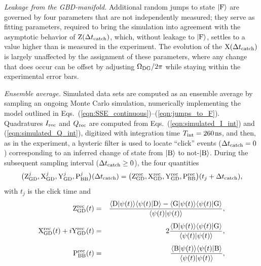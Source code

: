 \documentclass[
						superscriptaddress, 																 amsmath, amssymb,
		 aps,  prb,  
										floatfix,
		linenumbers,
			]{revtex4-1}
\begin{document}
\textit{Leakage from the {\rm GBD}-manifold.} Additional random jumps to state $|{\rm F}\rangle$ are governed by four parameters that are not independently measured; they serve as fitting parameters, required to bring the simulation into agreement with the asymptotic behavior of ${\rm Z}(\Delta t_{\rm catch})$, which, without leakage to $|{\rm F}\rangle$, settles  to a value higher than is measured in the experiment. The evolution of the ${\rm X}(\Delta t_{\rm catch})$ is largely unaffected by the assignment of these parameters, where any change that does occur can be offset by adjusting $\Omega_{\rm DG}/2\pi$ while staying within the experimental error bars.

\textit{Ensemble average.} Simulated data sets are computed as an ensemble average by sampling an ongoing Monte Carlo simulation, numerically implementing the model outlined in Eqs.~(\ref{eqn:SSE_continuous})--(\ref{eqn:jumps_to_F}). Quadratures $I_{\rm rec}$ and $Q_{\rm rec}$ are computed from Eqs.~(\ref{eqn:simulated_I_int}) and (\ref{eqn:simulated_Q_int}), digitized with integration time $T_{\rm int}=260\mkern2mu{\rm ns}$, and then, as in the experiment, a hysteric filter is used to locate ``click'' events ($\Delta t_{\rm catch}=0$) corresponding to an inferred change of state from $|{\rm B}\rangle$ to not-$|{\rm B}\rangle$. During the subsequent sampling interval ($\Delta t_{\rm catch}\geq0$), the four quantities
\begin{equation}
\big({\rm Z}_{\rm GD}^j,{\rm X}_{\rm GD}^j,{\rm Y}_{\rm GD}^j,{\rm P}_{\rm BB}^j\big)(\Delta t_{\rm catch})=\big({\rm Z}_{\rm GD}^{\rm rec},{\rm X}_{\rm GD}^{\rm rec},{\rm Y}_{\rm GD}^{\rm rec},{\rm P}_{\rm BB}^{\rm rec}\big)(t_j+\Delta t_{\rm catch}),
\end{equation}
with $t_j$ is the click time and
\begin{eqnarray}
{\rm Z}_{\rm GD}^{\rm rec}(t)&=&\frac{\langle{\rm D}|\psi(t)\rangle\langle\psi(t)|{\rm D}\rangle-\langle{\rm G}|\psi(t)\rangle\langle\psi(t)|{\rm G}\rangle}{\langle\psi(t)|\psi(t)\rangle},\label{eqn:correlated_Z_GD}\\
\noalign{\vskip4pt}
{\rm X}_{\rm GD}^{\rm rec}(t)+i{\rm Y}_{\rm GD}^{\rm rec}(t)&=&2\frac{\langle{\rm D}|\psi(t)\rangle\langle\psi(t)|{\rm G}\rangle}{\langle\psi(t)|\psi(t)\rangle},\label{eqn:correlated_X_GD&Y_GD}\\
\noalign{\vskip4pt}
{\rm P}_{\rm BB}^{\rm rec}(t)&=&\frac{\langle{\rm B}|\psi(t)\rangle\langle\psi(t)|{\rm B}\rangle}{\langle\psi(t)|\psi(t)\rangle},
\end{eqnarray}
\end{document}

